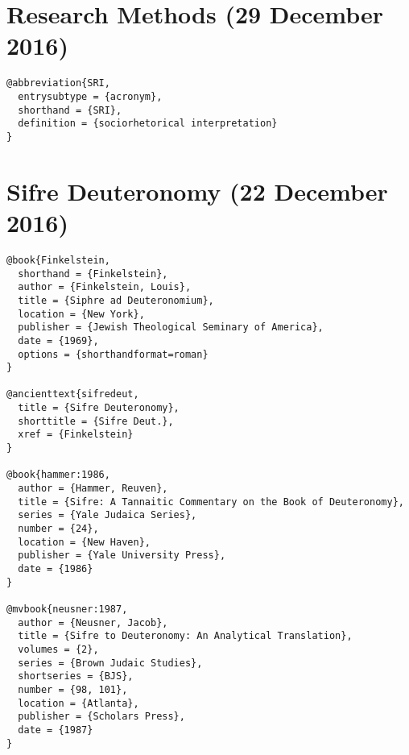 \documentclass[a4paper]{article}
\begin{document}
\section{Research Methods (29 December 2016)}

\begin{verbatim}
@abbreviation{SRI,
  entrysubtype = {acronym},
  shorthand = {SRI},
  definition = {sociorhetorical interpretation}
}
\end{verbatim}

\begin{verbcite}
  \nocite{SRI}
\end{verbcite}
\exampleabbreviations
{}

\section{Sifre Deuteronomy (22 December 2016)}

\begin{verbatim}
@book{Finkelstein,
  shorthand = {Finkelstein},
  author = {Finkelstein, Louis},
  title = {Siphre ad Deuteronomium},
  location = {New York},
  publisher = {Jewish Theological Seminary of America},
  date = {1969},
  options = {shorthandformat=roman}
}

@ancienttext{sifredeut,
  title = {Sifre Deuteronomy},
  shorttitle = {Sifre Deut.},
  xref = {Finkelstein}
}

@book{hammer:1986,
  author = {Hammer, Reuven},
  title = {Sifre: A Tannaitic Commentary on the Book of Deuteronomy},
  series = {Yale Judaica Series},
  number = {24},
  location = {New Haven},
  publisher = {Yale University Press},
  date = {1986}
}

@mvbook{neusner:1987,
  author = {Neusner, Jacob},
  title = {Sifre to Deuteronomy: An Analytical Translation},
  volumes = {2},
  series = {Brown Judaic Studies},
  shortseries = {BJS},
  number = {98, 101},
  location = {Atlanta},
  publisher = {Scholars Press},
  date = {1987}
}
\end{verbatim}

\begin{verbcite}
  \nocite{hammer:1986, neusner:1987}
\end{verbcite}
\exampleancientsources
\examplesecondarysources
\examplebibliography
{}
\end{document}
